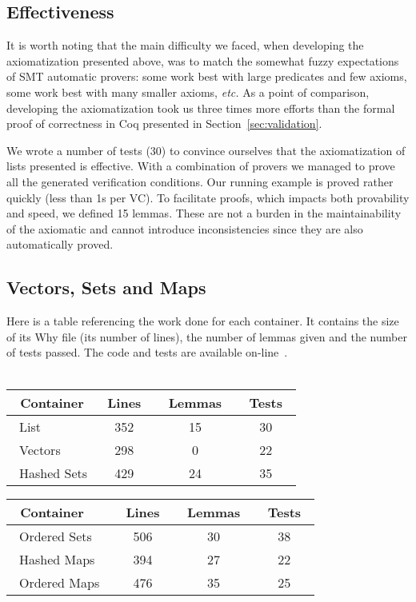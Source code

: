 \documentclass[runningheads,a4paper]{llncs}
\newcommand{\etc}{\textit{etc.}\xspace}
\newcommand{\beforesub}{\vspace{-0.2cm}}
\newcommand{\aftersub}{\vspace{-0.1cm}}
\begin{document}
\beforesub
\subsection{Effectiveness}
\aftersub

It is worth noting that the main difficulty we faced, when developing the
axiomatization presented above, was to match the somewhat fuzzy expectations of
SMT automatic provers: some work best with large predicates and few axioms,
some work best with many smaller axioms, \etc
\ifdefined\longversion
 As a point of comparison,
developing the axiomatization took us three times more efforts than the formal
proof of correctness in Coq presented in Section~\ref{sec:validation}.
\fi

We wrote a number of tests (30) to convince ourselves that the axiomatization
of lists presented is effective. With a combination of provers we managed to
prove all the generated verification conditions. Our running example is proved
rather quickly (less than 1s per VC). To facilitate proofs, which impacts both
provability and speed, we defined 15 lemmas. These are not a burden in the
maintainability of the axiomatic and cannot introduce inconsistencies since
they are also automatically proved.

\beforesub
\subsection{Vectors, Sets and Maps}
\aftersub

Here is a table referencing the work done for each container. It contains the
size of its Why file (its number of lines), the number of lemmas given and the
number of tests passed. The code and tests are available
on-line~\cite{dross:2011:fc-long}.\\
~\\
\begin{tabular}{|l|c|c|c||}
\hline
~Container & ~Lines~ & ~Lemmas~ & ~Tests~ \\
\hline
~List & 352 & 15 & 30 \\
\hline
~Vectors & 298 & 0 & 22 \\
\hline
~Hashed Sets & 429 & 24 & 35 \\
\hline
\end{tabular}\begin{tabular}{|l|c|c|c|}
\hline
~Container & ~Lines~ & ~Lemmas~ & ~Tests~ \\
\hline
~Ordered Sets & 506 & 30 & 38 \\
\hline
~Hashed Maps & 394 & 27 & 22 \\
\hline
~Ordered Maps~ & 476 & 35 & 25 \\
\hline
\end{tabular}\\
\end{document}
